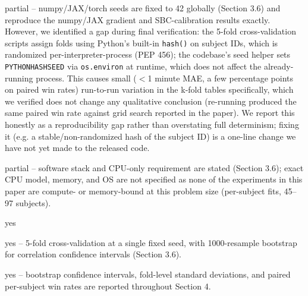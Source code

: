 \documentclass[letterpaper]{article}
\begin{document}
\begin{itemize}
\begin{itemize}
	partial -- numpy/JAX/torch seeds are fixed to 42 globally (Section 3.6) and reproduce the
	numpy/JAX gradient and SBC-calibration results exactly. However, we identified a gap during
	final verification: the 5-fold cross-validation scripts assign folds using Python's built-in
	\texttt{hash()} on subject IDs, which is randomized per-interpreter-process (PEP 456); the
	codebase's seed helper sets \texttt{PYTHONHASHSEED} via \texttt{os.environ} at runtime, which
	does not affect the already-running process. This causes small ($<$1 minute MAE, a few
	percentage points on paired win rates) run-to-run variation in the k-fold tables specifically,
	which we verified does not change any qualitative conclusion (re-running produced the same
	paired win rate against grid search reported in the paper). We report this honestly as a
	reproducibility gap rather than overstating full determinism; fixing it (e.g. a
	stable/non-randomized hash of the subject ID) is a one-line change we have not yet made to the
	released code.

	partial -- software stack and CPU-only requirement are stated (Section 3.6); exact CPU model,
	memory, and OS are not specified as none of the experiments in this paper are compute- or
	memory-bound at this problem size (per-subject fits, 45--97 subjects).

	yes

	yes -- 5-fold cross-validation at a single fixed seed, with 1000-resample bootstrap for
	correlation confidence intervals (Section 3.6).

	yes -- bootstrap confidence intervals, fold-level standard deviations, and paired per-subject
	win rates are reported throughout Section 4.


\end{itemize}
\end{itemize}
\end{document}

